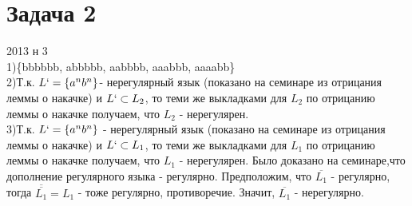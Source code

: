 \documentclass[a4paper,12pt]{article} %
\begin{document}
\section*{Задача 2}
2013 н 3\\

1)\{bbbbbb, abbbbb, aabbbb, aaabbb, aaaabb\}\\

2)Т.к. $L`=\{a^nb^n\} $- нерегулярный язык (показано на семинаре из отрицания леммы о накачке) и $L` \subset L_2$, то теми же выкладками для $L_2$ по отрицанию леммы о накачке получаем, что $L_2$ - нерегулярен.\\

3)Т.к. $ L`=\{a^nb^n\}$ - нерегулярный язык (показано на семинаре из отрицания леммы о накачке) и $L` \subset L_1$, то теми же выкладками для $L_1$ по отрицанию леммы о накачке получаем, что $L_1$ - нерегулярен. Было доказано на семинаре,что дополнение регулярного языка - регулярно. Предположим, что $ \overline{L_1}$ - регулярно, тогда $\overline{\overline{L_1}}= L_1$ - тоже регулярно, противоречие. Значит, $ \overline{L_1}$ - нерегулярно.\\
\end{document}
